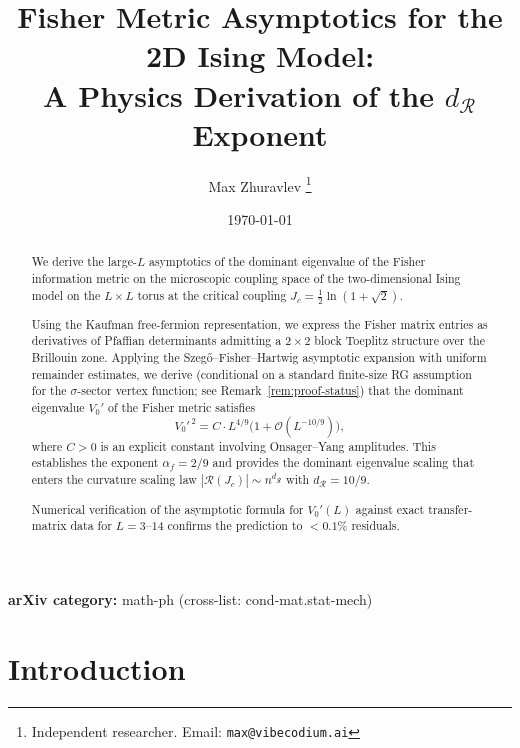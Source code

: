 \documentclass[11pt]{article}
\theoremstyle{definition}
\theoremstyle{remark}
\newcommand{\Jc}{J_c}
\newcommand{\dR}{d_{\mathcal{R}}}
\newcommand{\Scal}{\mathcal{R}}
\newcommand{\cO}{\mathcal{O}}
\begin{document}
\title{Fisher Metric Asymptotics for the 2D Ising Model:\\
A Physics Derivation of the $d_{\mathcal{R}}$ Exponent}

\author{Max Zhuravlev%
\thanks{Independent researcher. Email: \texttt{max@vibecodium.ai}}}

\date{\today}

\maketitle

\begin{abstract}
We derive the large-$L$ asymptotics of the dominant eigenvalue of the
Fisher information metric on the microscopic coupling space of
the two-dimensional Ising model on the $L \times L$ torus at the
critical coupling $\Jc = \frac{1}{2}\ln(1+\sqrt{2})$.

Using the Kaufman free-fermion representation, we express the Fisher
matrix entries as derivatives of Pfaffian determinants admitting a
$2 \times 2$ block Toeplitz structure over the Brillouin zone.
Applying the Szeg\H{o}--Fisher--Hartwig asymptotic expansion with
uniform remainder estimates, we derive (conditional on a standard
finite-size RG assumption for the $\sigma$-sector vertex function;
see Remark~\ref{rem:proof-status}) that the dominant eigenvalue
$V_0'$ of the Fisher metric satisfies
\[
  V_0'^{\,2} = C \cdot L^{4/9}\bigl(1 + \cO(L^{-10/9})\bigr),
\]
where $C > 0$ is an explicit constant involving
Onsager--Yang amplitudes. This establishes the exponent
$\alpha_f = 2/9$ and provides the dominant eigenvalue
scaling that enters the curvature scaling law
$|\Scal(\Jc)| \sim n^{\dR}$ with $\dR = 10/9$.

Numerical verification of the asymptotic formula for $V_0'(L)$
against exact transfer-matrix data for $L = 3$--$14$ confirms the
prediction to $< 0.1\%$ residuals.
\end{abstract}

\noindent\textbf{arXiv category:} math-ph (cross-list: cond-mat.stat-mech)

\section{Introduction}
\label{sec:intro}
\end{document}
